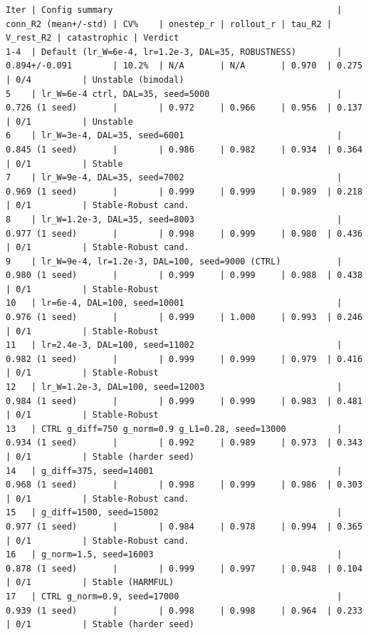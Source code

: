 \documentclass{article}
\begin{document}
\begin{tiny}
\begin{verbatim}
Iter | Config summary                                            | conn_R2 (mean+/-std) | CV%    | onestep_r | rollout_r | tau_R2 | V_rest_R2 | catastrophic | Verdict
1-4  | Default (lr_W=6e-4, lr=1.2e-3, DAL=35, ROBUSTNESS)        | 0.894+/-0.091        | 10.2%  | N/A       | N/A       | 0.970  | 0.275     | 0/4          | Unstable (bimodal)
5    | lr_W=6e-4 ctrl, DAL=35, seed=5000                         | 0.726 (1 seed)       |        | 0.972     | 0.966     | 0.956  | 0.137     | 0/1          | Unstable
6    | lr_W=3e-4, DAL=35, seed=6001                              | 0.845 (1 seed)       |        | 0.986     | 0.982     | 0.934  | 0.364     | 0/1          | Stable
7    | lr_W=9e-4, DAL=35, seed=7002                              | 0.969 (1 seed)       |        | 0.999     | 0.999     | 0.989  | 0.218     | 0/1          | Stable-Robust cand.
8    | lr_W=1.2e-3, DAL=35, seed=8003                            | 0.977 (1 seed)       |        | 0.998     | 0.999     | 0.980  | 0.436     | 0/1          | Stable-Robust cand.
9    | lr_W=9e-4, lr=1.2e-3, DAL=100, seed=9000 (CTRL)           | 0.980 (1 seed)       |        | 0.999     | 0.999     | 0.988  | 0.438     | 0/1          | Stable-Robust
10   | lr=6e-4, DAL=100, seed=10001                              | 0.976 (1 seed)       |        | 0.999     | 1.000     | 0.993  | 0.246     | 0/1          | Stable-Robust
11   | lr=2.4e-3, DAL=100, seed=11002                            | 0.982 (1 seed)       |        | 0.999     | 0.999     | 0.979  | 0.416     | 0/1          | Stable-Robust
12   | lr_W=1.2e-3, DAL=100, seed=12003                          | 0.984 (1 seed)       |        | 0.999     | 0.999     | 0.983  | 0.481     | 0/1          | Stable-Robust
13   | CTRL g_diff=750 g_norm=0.9 g_L1=0.28, seed=13000          | 0.934 (1 seed)       |        | 0.992     | 0.989     | 0.973  | 0.343     | 0/1          | Stable (harder seed)
14   | g_diff=375, seed=14001                                    | 0.968 (1 seed)       |        | 0.998     | 0.999     | 0.986  | 0.303     | 0/1          | Stable-Robust cand.
15   | g_diff=1500, seed=15002                                   | 0.977 (1 seed)       |        | 0.984     | 0.978     | 0.994  | 0.365     | 0/1          | Stable-Robust cand.
16   | g_norm=1.5, seed=16003                                    | 0.878 (1 seed)       |        | 0.999     | 0.997     | 0.948  | 0.104     | 0/1          | Stable (HARMFUL)
17   | CTRL g_norm=0.9, seed=17000                               | 0.939 (1 seed)       |        | 0.998     | 0.998     | 0.964  | 0.233     | 0/1          | Stable (harder seed)

\end{verbatim}
\end{tiny}
\end{document}
